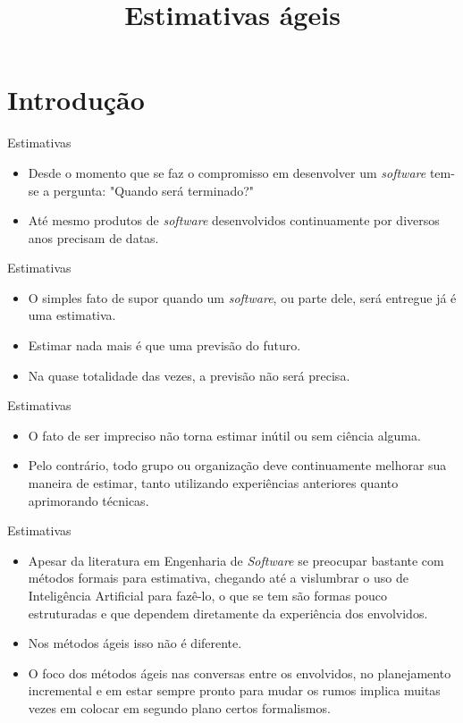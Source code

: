 \documentclass[11pt]{beamer}
\title{Estimativas ágeis}
\author{}
\date{}
\begin{document}
    \begin{frame}[plain]
        \titlepage
    \end{frame}

   \section{Introdução}

    \begin{frame}{Estimativas}
        \begin{itemize}
            \item Desde o momento que se faz o compromisso em desenvolver um \textit{software} tem-se a pergunta: "Quando será terminado?"
            \item Até mesmo produtos de \textit{software} desenvolvidos continuamente por diversos anos precisam de datas.
        \end{itemize}
    \end{frame}

    \begin{frame}{Estimativas}
        \begin{itemize}
            \item O simples fato de supor quando um \textit{software}, ou parte dele, será entregue já é uma estimativa.
            \item Estimar nada mais é que uma previsão do futuro.
            \item Na quase totalidade das vezes, a previsão não será precisa.
        \end{itemize}
    \end{frame}

    \begin{frame}{Estimativas}
        \begin{itemize}
            \item O fato de ser impreciso não torna estimar inútil ou sem ciência alguma.
            \item Pelo contrário, todo grupo ou organização deve continuamente melhorar sua maneira de estimar, tanto utilizando experiências anteriores quanto aprimorando técnicas.
        \end{itemize}
    \end{frame}

    \begin{frame}{Estimativas}
        \begin{itemize}
            \item Apesar da literatura em Engenharia de \textit{Software} se preocupar bastante com métodos formais para estimativa, chegando até a vislumbrar o uso de Inteligência Artificial para fazê-lo, o que se tem são formas pouco estruturadas e que dependem diretamente da experiência dos envolvidos.
            \item Nos métodos ágeis isso não é diferente.
            \item O foco dos métodos ágeis nas conversas entre os envolvidos, no planejamento incremental e em estar sempre pronto para mudar os rumos implica muitas vezes em colocar em segundo plano certos formalismos. 
        \end{itemize}
    \end{frame}
\end{document}
